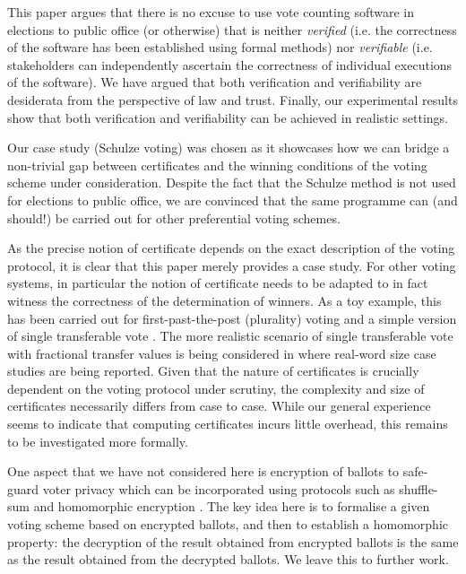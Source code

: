 \documentclass{llncs}
\begin{document}
This paper argues that there is no excuse to use vote
counting software in elections to public office (or otherwise) that
is neither \emph{verified} (i.e. the correctness of the software has
been established using formal methods) nor \emph{verifiable} (i.e.
stakeholders can independently ascertain the correctness of
individual executions of the software). We have argued that both
verification and verifiability are desiderata from the
perspective of law and trust. Finally, our experimental results show
that  both verification and verifiability can be achieved in
realistic settings. 

Our case study (Schulze voting) was chosen as it showcases how we
can bridge a non-trivial gap 
between certificates and the winning conditions of
the voting scheme under consideration. Despite the fact that the
Schulze method is not used for elections to public office, we are
convinced that the same programme can (and should!) be carried out for other
preferential voting schemes. 

As the precise notion of certificate depends on
the exact description of the voting protocol, it is clear that this
paper merely provides a case study. For other voting systems, in
particular the notion of certificate needs to be adapted to in fact
witness the correctness of the determination of winners. As a toy
example, this has been carried out for first-past-the-post
(plurality) voting and a simple version of single transferable vote
\cite{Pattinson:2015:VCM}. The  more realistic scenario of single
transferable vote with fractional transfer values is being
considered in \cite{Ghale:2017:FVS} where real-word size case
studies are being reported.  Given that the nature of certificates
is crucially dependent on the voting protocol under scrutiny, the
complexity and size of certificates necessarily differs from case to
case. While our general experience seems to indicate that computing
certificates incurs  little overhead, this remains to be
investigated more formally. 

One aspect that we have not considered here is encryption of
ballots to safe-guard voter privacy which can be incorporated using
protocols such as shuffle-sum \cite{Benaloh:2009:SSC} and
homomorphic encryption \cite{Yi:2014:HEA}. The key idea here is to
formalise a given voting scheme based on encrypted ballots, and then
to establish a homomorphic property: the decryption of the result
obtained from encrypted ballots is the same as the result obtained from
the decrypted ballots.  We leave this to further work.



\end{document}
